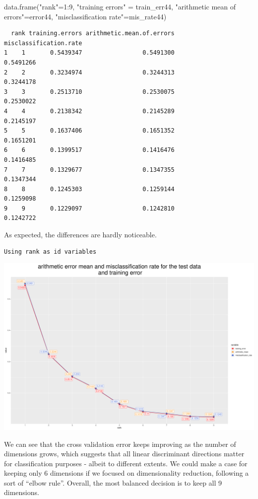 \documentclass[
  letterpaper,
  DIV=11,
  numbers=noendperiod]{scrartcl}
\newenvironment{Shaded}{\begin{snugshade}}{\end{snugshade}}
\newcommand{\DecValTok}[1]{\textcolor[rgb]{0.68,0.00,0.00}{#1}}
\newcommand{\FunctionTok}[1]{\textcolor[rgb]{0.28,0.35,0.67}{#1}}
\newcommand{\NormalTok}[1]{\textcolor[rgb]{0.00,0.23,0.31}{#1}}
\newcommand{\OtherTok}[1]{\textcolor[rgb]{0.00,0.23,0.31}{#1}}
\newcommand{\SpecialCharTok}[1]{\textcolor[rgb]{0.37,0.37,0.37}{#1}}
\newcommand{\StringTok}[1]{\textcolor[rgb]{0.13,0.47,0.30}{#1}}
\begin{document}
\begin{Shaded}
\begin{Highlighting}[]
\FunctionTok{data.frame}\NormalTok{(}\StringTok{"rank"}\OtherTok{=}\DecValTok{1}\SpecialCharTok{:}\DecValTok{9}\NormalTok{, }\StringTok{"training errors"} \OtherTok{=}\NormalTok{ train\_err44, }
       \StringTok{"arithmetic mean of errors"}\OtherTok{=}\NormalTok{error44,}
\StringTok{"misclassification rate"}\OtherTok{=}\NormalTok{mis\_rate44)}
\end{Highlighting}
\end{Shaded}

\begin{verbatim}
  rank training.errors arithmetic.mean.of.errors misclassification.rate
1    1       0.5439347                 0.5491300              0.5491266
2    2       0.3234974                 0.3244313              0.3244178
3    3       0.2513710                 0.2530075              0.2530022
4    4       0.2138342                 0.2145289              0.2145197
5    5       0.1637406                 0.1651352              0.1651201
6    6       0.1399517                 0.1416476              0.1416485
7    7       0.1329677                 0.1347355              0.1347344
8    8       0.1245303                 0.1259144              0.1259098
9    9       0.1229097                 0.1242810              0.1242722
\end{verbatim}

As expected, the differences are hardly noticeable.

\begin{verbatim}
Using rank as id variables
\end{verbatim}

\includegraphics{ProblemSet2_files/figure-pdf/unnamed-chunk-77-1.pdf}

We can see that the cross validation error keeps improving as the number
of dimensions grows, which suggests that all linear discriminant
directions matter for classification purposes - albeit to different
extents. We could make a case for keeping only 6 dimensions if we
focused on dimensionality reduction, following a sort of ``elbow rule''.
Overall, the most balanced decision is to keep all 9 dimensions.
\end{document}
